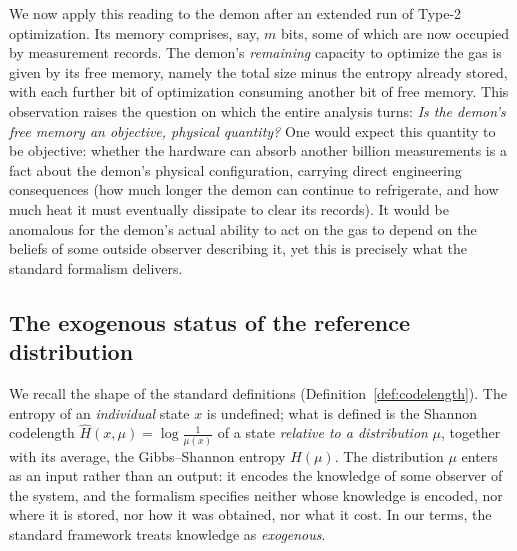 \documentclass[11pt]{article}
\begin{document}
We now apply this reading to the demon after an extended run of Type-2 optimization. Its memory comprises, say, $m$ bits, some of which are now occupied by measurement records. The demon's \emph{remaining} capacity to optimize the gas is given by its free memory, namely the total size minus the entropy already stored, with each further bit of optimization consuming another bit of free memory. This observation raises the question on which the entire analysis turns: \emph{Is the demon's free memory an objective, physical quantity?} One would expect this quantity to be objective: whether the hardware can absorb another billion measurements is a fact about the demon's physical configuration, carrying direct engineering consequences (how much longer the demon can continue to refrigerate, and how much heat it must eventually dissipate to clear its records). It would be anomalous for the demon's actual ability to act on the gas to depend on the beliefs of some outside observer describing it, yet this is precisely what the standard formalism delivers.

\subsection{The exogenous status of the reference distribution}
\label{sec:exogenous}

We recall the shape of the standard definitions (Definition~\ref{def:codelength}). The entropy of an \emph{individual} state $x$ is undefined; what is defined is the Shannon codelength $\hat H(x, \mu) = \log \frac{1}{\mu(x)}$ of a state \emph{relative to a distribution} $\mu$, together with its average, the Gibbs--Shannon entropy $H(\mu)$. The distribution $\mu$ enters as an input rather than an output: it encodes the knowledge of some observer of the system, and the formalism specifies neither whose knowledge is encoded, nor where it is stored, nor how it was obtained, nor what it cost. In our terms, the standard framework treats knowledge as \emph{exogenous}.
\end{document}

